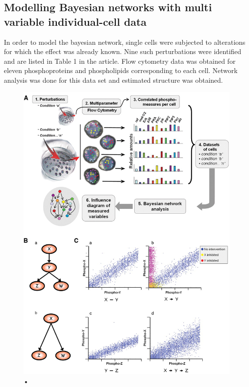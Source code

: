 \documentclass[conference]{IEEEtran}
\begin{document}
\subsection{Modelling Bayesian networks with multi variable individual-cell data}
In order to model the bayesian network, single cells were subjected to alterations for which the effect was already known. Nine such perturbations were identified and are listed in Table 1 in the article. Flow cytometry \cite{o2013flow} data was obtained for eleven phosphoproteins and phospholipids corresponding to each cell. Network analysis was done for this data set and estimated structure was obtained.\par
\begin{figure}[H]
\centering
\includegraphics[width=\linewidth]{Images/Fig1.jpg}
\caption{•}
\end{figure}
\end{document}
